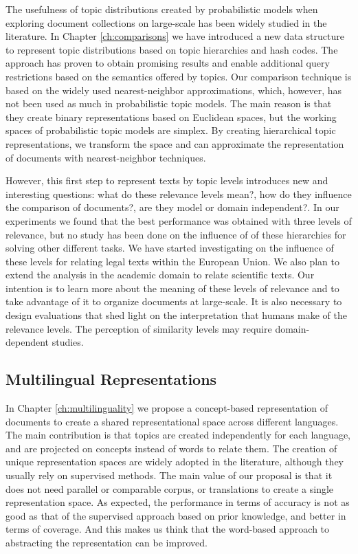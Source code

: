 The usefulness of topic distributions created by probabilistic models when exploring document collections on large-scale has been widely studied in the literature. In Chapter \ref{ch:comparisons} we have introduced a new data structure to represent topic distributions based on topic hierarchies and hash codes. The approach has proven to obtain promising results and enable additional query restrictions based on the semantics offered by topics. Our comparison technique is based on the widely used nearest-neighbor approximations, which, however, has not been used as much in probabilistic topic models. The main reason is that they 
create binary representations based on Euclidean spaces, but the working spaces of probabilistic topic models are simplex. By creating hierarchical topic representations, we transform the space and can approximate the representation of documents with nearest-neighbor techniques.

However, this first step to represent texts by topic levels introduces new and interesting questions: what do these relevance levels mean?, how do they influence the comparison of documents?, are they model or domain independent?. In our experiments we found that the best performance was obtained with three levels of relevance, but no study has been done on the influence of of these hierarchies for solving other different tasks. We have started investigating on the influence of these levels for relating legal texts within the European Union. We also plan to extend the analysis in the academic domain to relate scientific texts. Our intention is to learn more about the meaning of these levels of relevance and to take advantage of it to organize documents at large-scale. It is also necessary to design evaluations that shed light on the interpretation that humans make of the relevance levels. The perception of similarity levels may require domain-dependent studies.



\subsection{Multilingual Representations}

In Chapter \ref{ch:multilinguality} we propose a concept-based representation of documents to create a shared representational space across different languages. The main contribution is that topics are created independently for each language, and are projected on concepts instead of words to relate them. The creation of unique representation spaces are widely adopted in the literature, although they usually rely on supervised methods. The main value of our proposal is that it does not need parallel or comparable corpus, or translations to create a single representation space. As expected, the performance in terms of accuracy is not as good as that of the supervised approach based on prior knowledge, and better in terms of coverage. And this makes us think that the word-based approach to abstracting the representation can be improved.

